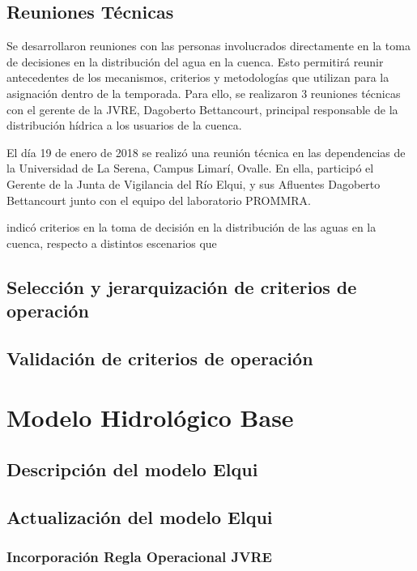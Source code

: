 \documentclass[10pt,]{article}
\begin{document}
		\subsection{Reuniones Técnicas}
		
		
		Se desarrollaron reuniones con las personas involucrados directamente en la toma de decisiones en la distribución del agua en la cuenca. Esto permitirá reunir antecedentes de los mecanismos, criterios y metodologías que utilizan para la asignación dentro de la temporada. Para ello, se realizaron 3 reuniones técnicas con el gerente de la JVRE, Dagoberto Bettancourt, principal responsable de la distribución hídrica a los usuarios de la cuenca.
		
		El día 19 de enero de 2018 se realizó una reunión técnica en las dependencias de la Universidad de La Serena, Campus Limarí, Ovalle. En ella, participó el Gerente de la Junta de Vigilancia del Río Elqui,  y sus Afluentes Dagoberto Bettancourt junto con el equipo del laboratorio PROMMRA.
		
		indicó criterios en la toma de decisión en la distribución de las aguas en la cuenca, respecto a distintos escenarios que 
		
		
		\subsection{Selección y jerarquización de criterios de operación}
		\subsection{Validación de criterios de operación}\bigskip

\section{Modelo Hidrológico Base}\bigskip

		\subsection{Descripción del modelo Elqui}
		\subsection{Actualización del modelo Elqui}\bigskip
		
			\subsubsection{Incorporación Regla Operacional JVRE}\bigskip
			
\end{document}
